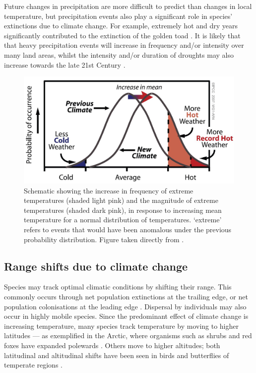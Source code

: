\documentclass[12pt,a4paper,]{report}
\theoremstyle{definition}
\theoremstyle{definition}
\theoremstyle{definition}
\theoremstyle{remark}
\begin{document}
Future changes in precipitation are more difficult to predict than
changes in local temperature, but precipitation events also play a
significant role in species' extinctions due to climate change. For
example, extremely hot and dry years significantly contributed to the
extinction of the golden toad \citep{pounds_biological_1999}. It is
likely that that heavy precipitation events will increase in frequency
and/or intensity over many land areas, whilst the intensity and/or
duration of droughts may also increase towards the late 21st Century
\citep{ipcc_climate_2013}.

\begin{figure}
\centering
\includegraphics{figs/fig1.1.jpg}
\caption{\label{fig:fig-1-1}Schematic showing the increase in frequency of extreme
temperatures (shaded light pink) and the magnitude of extreme
temperatures (shaded dark pink), in response to increasing mean
temperature for a normal distribution of temperatures. `extreme' refers
to events that would have been anomalous under the previous probability
distribution. Figure taken directly from \citet{ipcc_climate_2007}.}
\end{figure}

\subsection{Range shifts due to climate
change}\label{range-shifts-due-to-climate-change}

Species may track optimal climatic conditions by shifting their range.
This commonly occurs through net population extinctions at the trailing
edge, or net population colonisations at the leading edge
\citep{parmesan_poleward_1999}. Dispersal by individuals may also occur
in highly mobile species. Since the predominant effect of climate change
is increasing temperature, many species track temperature by moving to
higher latitudes --- as exemplified in the Arctic, where organisms such
as shrubs and red foxes have expanded polewards
\citep{hersteinsson_interspecific_1992, sturm_climate_2001}. Others move
to higher altitudes; both latitudinal and altitudinal shifts have been
seen in birds and butterflies of temperate regions
\citep{hill_responses_2002, parmesan_poleward_1999, thomas_birds_1999}.
\end{document}
